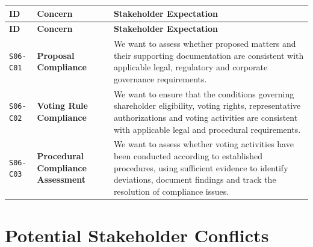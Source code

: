 \documentclass[11pt,a4paper]{article}
\begin{document}
\begingroup\small
\begin{longtable}{@{}>{\raggedright\arraybackslash}p{}>{\raggedright\arraybackslash}p{}>{\raggedright\arraybackslash}p{}@{}}
\toprule
\textbf{ID} & \textbf{Concern} & \textbf{Stakeholder Expectation} \\
\midrule
\endfirsthead
\toprule
\textbf{ID} & \textbf{Concern} & \textbf{Stakeholder Expectation} \\
\midrule
\endhead
\bottomrule
\endfoot
\texttt{S06-C01} & \textbf{Proposal Compliance} & We want to assess whether proposed matters and their supporting documentation are consistent with applicable legal, regulatory and corporate governance requirements. \\
\addlinespace
\texttt{S06-C02} & \textbf{Voting Rule Compliance} & We want to ensure that the conditions governing shareholder eligibility, voting rights, representative authorizations and voting activities are consistent with applicable legal and procedural requirements. \\
\addlinespace
\texttt{S06-C03} & \textbf{Procedural Compliance Assessment} & We want to assess whether voting activities have been conducted according to established procedures, using sufficient evidence to identify deviations, document findings and track the resolution of compliance issues. \\
\end{longtable}
\endgroup


\section*{Potential Stakeholder Conflicts}
\end{document}
